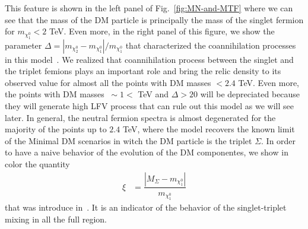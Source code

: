 \documentclass[12pt,letterpaper]{article}
\begin{document}
This feature is shown in the left panel of Fig.~\ref{fig:MN-and-MTF} where we can see that the mass of the DM particle is principally the mass of the singlet fermion for $m_{\chi_1^0}<2$ TeV. 
Even more, in the right panel of this figure, we show the parameter $\Delta=|m_{\chi_2^0}-m_{\chi_1^0}|/m_{\chi_1^0}$ that characterized the coannihilation processes in this model~\cite{Griest:1990kh}. 
We realized that coannihilation process between the singlet and the triplet femions plays an important role and bring the relic density to its observed value for almost all the points with DM masses $<2.4$ TeV. Even more, the points with DM masses $~\sim 1<$ TeV and $\Delta > 20$ will be depreciated because they will generate high LFV process that can rule out this model as we will see later. 
In general, the neutral fermion spectra is almost degenerated for the majority of the points up to $2.4$ TeV, where the model recovers the known limit of the Minimal DM scenarios in witch the DM particle is the triplet $\Sigma$. 
In order to have a naive behavior of the evolution of the DM componentes, we show in color the quantity
%
\begin{align}
\label{eq:xi}
\xi &=\dfrac{|M_\Sigma - m_{\chi^0_1}|}{m_{\chi^0_1}}
\end{align}
%
that was introduce in~\cite{Hirsch:2013ola}. It is an indicator of the behavior of the singlet-triplet mixing in all the full region.
%
\end{document}
